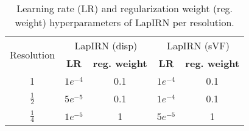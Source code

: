 \begin{table*}[htp]
	\centering
	\begin{small}
		\begin{tabular}{ccccc}
			\toprule
			\multicolumn{1}{c}{\multirow{2}{*}{Resolution}} & \multicolumn{2}{c}{LapIRN (disp)} & \multicolumn{2}{c}{LapIRN (sVF)}                                  \\
			\cmidrule{2-5}
			\multicolumn{1}{c}{}                            & \multicolumn{1}{c}{\bf LR}        & \multicolumn{1}{c}{\bf reg. weight} & \bf LR    & \bf reg. weight \\ \midrule
			1                                               & $1e^{-4}$                         & 0.1                                 & $1e^{-4}$ & 0.1             \\
			$\frac{1}{2}$                                  & $5e^{-5}$                         & 0.1                                 & $1e^{-4}$ & 0.1             \\
			$\frac{1}{4}$                                  & $1e^{-5}$                         & 1                                   & $5e^{-5}$ & 1               \\ \bottomrule
		\end{tabular}
		\caption{\label{tab:exp_lapirn_parameters} Learning rate (LR) and regularization weight (reg. weight) hyperparameters of LapIRN per resolution.}
	\end{small}
\end{table*}

